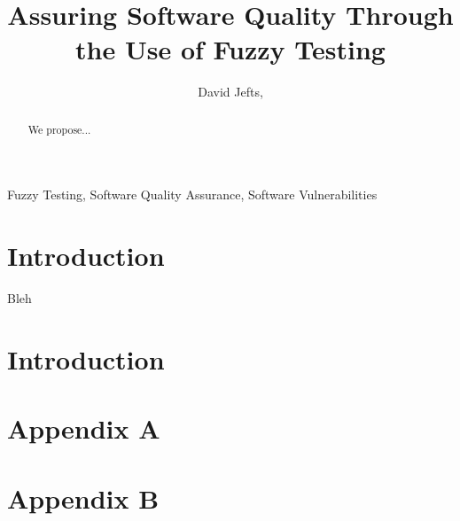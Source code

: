\documentclass[10pt, compsoc]{IEEEtran}
\begin{document}
\title{Assuring Software Quality Through the Use of Fuzzy Testing}
\author{David Jefts, }

\maketitle

\begin{abstract}
	We propose...
\end{abstract}

\begin{IEEEkeywords}
	Fuzzy Testing, Software Quality Assurance, Software Vulnerabilities
\end{IEEEkeywords}

\section{Introduction}
	Bleh

\section{Introduction}

\pagebreak
	
\appendix
	\section{Appendix A}
	
	\section{Appendix B}
	
\newpage
\nocite{*}


\end{document}

